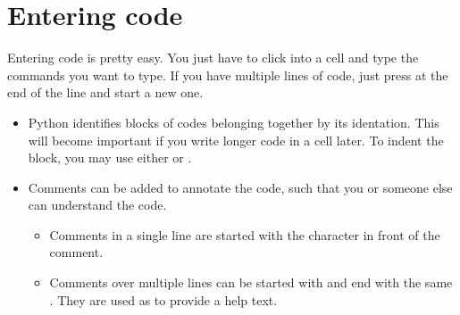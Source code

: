 \documentclass[letterpaper,10pt,english]{sphinxmanual}
\begin{document}
\section{Entering code}
\label{\detokenize{notebooks/Intro/EditCells:Entering-code}}\label{\detokenize{notebooks/Intro/EditCells::doc}}
Entering code is pretty easy. You just have to click into a cell and type the commands you want to type. If you have multiple lines of code, just press  at the end of the line and start a new one.
\begin{itemize}
\item {} 
 Python identifies blocks of codes belonging together by its identation. This will become important if you write longer code in a cell later. To indent the block, you may use either  or .

\item {} 
 Comments can be added to annotate the code, such that you or someone else can understand the code.
\begin{itemize}
\item {} 
Comments in a single line are started with the \sphinxcode{\sphinxupquote{\#}} character in front of the comment.

\item {} 
Comments over multiple lines can be started with \sphinxcode{\sphinxupquote{\textquotesingle{}\textquotesingle{}\textquotesingle{}}}and end with the same \sphinxcode{\sphinxupquote{\textquotesingle{}\textquotesingle{}\textquotesingle{}}}. They are used as  to provide a help text.

\end{itemize}

\end{itemize}

{
\begin{sphinxVerbatim}[commandchars=\\\{\}]
\llap{\color{nbsphinxin}[2]:\,\hspace{\fboxrule}\hspace{\fboxsep}}

 
     
\end{sphinxVerbatim}
}
\end{document}

